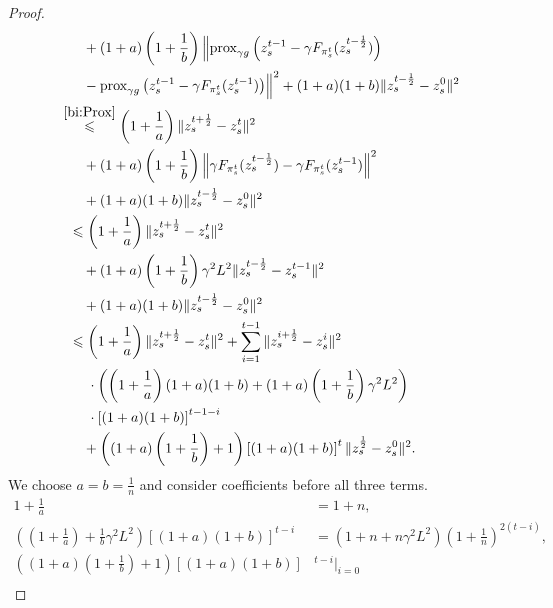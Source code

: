 \documentclass{article}
\begin{document}
\begin{proof}
\begin{align}
            \notag &~~\quad + (1 + a)\left(1 + \frac{1}{b}\right)\Bigl\|\text{prox}_{\gamma g}\left(z_s^{t-1} -\gamma F_{\pi_s^t}(z_s^{t - \frac{1}{2}})\right) \\
            \notag & ~~\quad- \text{prox}_{\gamma g}\left(z_s^{t-1} - \gamma F_{\pi_s^t}(z_s^{t - 1})\right)\Bigr\|^2 + (1 + a)(1 + b)\|z_s^{t - \frac{1}{2}} - z_s^0\|^2 \\
            \notag &\overset{\eqref{bi:Prox}}{\leqslant} \left(1 + \frac{1}{a}\right)\|z_s^{t + \frac{1}{2}} - z_s^t\|^2 \\
            \notag &~~\quad + (1 + a)\left(1 + \frac{1}{b}\right)\left\|\gamma F_{\pi_s^t}(z_s^{t - \frac{1}{2}}) - \gamma F_{\pi_s^t}(z_s^{t - 1})\right\|^2 \\
            \notag &~~\quad + (1 + a)(1 + b)\|z_s^{t - \frac{1}{2}} - z_s^0\|^2 \\
            \notag &~~\leqslant \left(1 + \frac{1}{a}\right)\|z_s^{t + \frac{1}{2}} - z_s^t\|^2 \\
            \notag &~~\quad + (1 + a)\left(1 + \frac{1}{b}\right)\gamma^2 L^2\|z_s^{t - \frac{1}{2}} - z_s^{t - 1}\|^2 \\
            \notag &~~\quad + (1 + a)(1 + b)\|z_s^{t - \frac{1}{2}} - z_s^0\|^2 \\
            \notag &~~\leqslant \left(1 + \frac{1}{a}\right)\|z_s^{t+\frac{1}{2}} - z_s^t\|^2 + \sum\limits_{i = 1}^{t-1}\|z_s^{i+\frac{1}{2}} - z_s^i\|^2  \\
            \notag &~~\quad ~ \cdot \left(\left(1+\frac{1}{a}\right)(1+a)(1+b) + (1+a)\left(1+\frac{1}{b}\right)\gamma^2 L^2 \right)\\
            \notag &~~\quad ~ \cdot \left[(1+a)(1+b)\right]^{t-1-i} \\
            \label{t1:ineq6}& ~~\quad + \left((1+a)\left(1+\frac{1}{b}\right)  + 1\right)\left[(1+a)(1+b)\right]^t\|z_s^{\frac{1}{2}} - z_s^0\|^2.
        \end{align}
        We choose $a = b = \frac{1}{n}$ and consider coefficients before all three terms.
        \begin{align*}
            1 + \frac{1}{a} &= 1 + n,\\
            \left(\left(1 + \frac{1}{a}\right) + \frac{1}{b}\gamma^2 L^2\right)\left[(1+a)(1+b)\right]^{t-i} &= (1 + n + n\gamma^2 L^2)\left(1 + \frac{1}{n}\right)^{2(t-i)},\\
            \left((1+a)\left(1+\frac{1}{b}\right)+1\right)\left[(1+a)(1+b)\right]&^{t-i}\bigg|_{i = 0} \\

\end{align*}
\end{proof}
\end{document}
